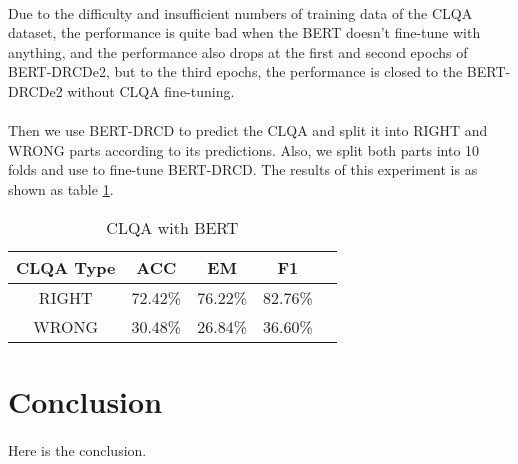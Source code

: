 \documentclass{article}
\begin{document}
\paragraph{}
Due to the difficulty and insufficient numbers of training data of the CLQA dataset, the performance is quite bad when the BERT doesn't fine-tune with anything, and the performance also drops at the first and second epochs of BERT-DRCDe2, but to the third epochs, the performance is closed to the BERT-DRCDe2 without CLQA fine-tuning.

\paragraph{}
Then we use BERT-DRCD to predict the CLQA and split it into RIGHT and WRONG parts according to its predictions. Also, we split both parts into 10 folds and use to fine-tune BERT-DRCD. The results of this experiment is as shown as table \ref{tab:bert-clqa-right-wrong}.

\begin{table}[ht!]
  \centering
  \caption{CLQA with BERT}
  \begin{tabular}{ccccc}
    CLQA Type & ACC & EM & F1\\
    \toprule
    RIGHT & 72.42\% & 76.22\% & 82.76\% \\
    WRONG & 30.48\% & 26.84\% & 36.60\% \\
  \end{tabular}
  \label{tab:bert-clqa-right-wrong}
\end{table}

\section{Conclusion}
\paragraph{}
Here is the conclusion.



\end{document}
